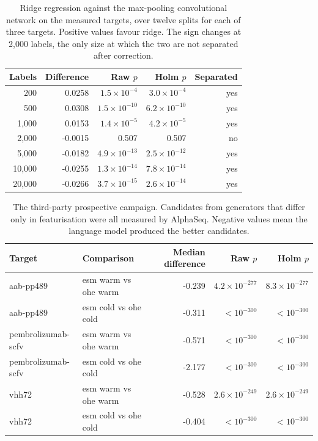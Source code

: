 \documentclass[11pt,a4paper]{article}
\begin{document}
\begin{table}[h]
\caption{Ridge regression against the max-pooling convolutional network on the
measured targets, over twelve splits for each of three targets. Positive values
favour ridge. The sign changes at 2,000 labels, the only size at which the two
are not separated after correction.}
\centering
\begin{tabular}{@{}rrrrr@{}}
\toprule
Labels & Difference & Raw $p$ & Holm $p$ & Separated \\
\midrule
200 & 0.0258 & $1.5\times 10^{-4}$ & $3.0\times 10^{-4}$ & yes \\
500 & 0.0308 & $1.5\times 10^{-10}$ & $6.2\times 10^{-10}$ & yes \\
1,000 & 0.0153 & $1.4\times 10^{-5}$ & $4.2\times 10^{-5}$ & yes \\
2,000 & -0.0015 & 0.507 & 0.507 & no \\
5,000 & -0.0182 & $4.9\times 10^{-13}$ & $2.5\times 10^{-12}$ & yes \\
10,000 & -0.0255 & $1.3\times 10^{-14}$ & $7.8\times 10^{-14}$ & yes \\
20,000 & -0.0266 & $3.7\times 10^{-15}$ & $2.6\times 10^{-14}$ & yes \\
\bottomrule
\end{tabular}
\end{table}
\begin{table}[h]
\caption{The third-party prospective campaign. Candidates from generators that
differ only in featurisation were all measured by AlphaSeq. Negative values
mean the language model produced the better candidates.}
\centering
\begin{tabular}{@{}llrrr@{}}
\toprule
Target & Comparison & Median difference & Raw $p$ & Holm $p$ \\
\midrule
aab-pp489 & esm warm vs ohe warm & -0.239 & $4.2\times 10^{-277}$ & $8.3\times 10^{-277}$ \\
aab-pp489 & esm cold vs ohe cold & -0.311 & $<10^{-300}$ & $<10^{-300}$ \\
pembrolizumab-scfv & esm warm vs ohe warm & -0.571 & $<10^{-300}$ & $<10^{-300}$ \\
pembrolizumab-scfv & esm cold vs ohe cold & -2.177 & $<10^{-300}$ & $<10^{-300}$ \\
vhh72 & esm warm vs ohe warm & -0.528 & $2.6\times 10^{-249}$ & $2.6\times 10^{-249}$ \\
vhh72 & esm cold vs ohe cold & -0.404 & $<10^{-300}$ & $<10^{-300}$ \\
\bottomrule
\end{tabular}
\end{table}
\end{document}
